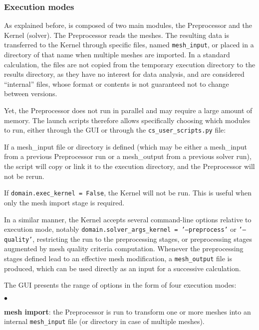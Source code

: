 {{{{{%
\subsubsection{Execution modes}
\label{sec:prg_executionmodes}%
As explained before, \CS is composed of two main modules, the Preprocessor and the
Kernel (solver). The Preprocessor reads the meshes.
The resulting data is transferred to the Kernel through specific
files, named \texttt{mesh\_input}, or placed in a directory of that name when multiple meshes are imported. In a standard calculation, the files
are not copied from the temporary execution directory to the results directory,
as they have no interest for data analysis, and are considered ``internal''
files, whose format or contents is not guaranteed not to change between \CS versions.

Yet, the Preprocessor does not run in parallel and may require a
large amount of memory. The launch scripts therefore allows specifically
choosing which modules to run, either through the GUI or through the
\texttt{cs\_user\_scripts.py} file:

\hspace*{0.5cm} If a {mesh\_input} file or directory is defined (which may be
either a {mesh\_input} from a previous Preprocessor run or a {mesh\_output}
from a previous solver run), the script will copy or link it to
the execution directory, and the Preprocessor will not be rerun.

\hspace*{0.5cm} If \texttt{domain.exec\_kernel = False}, the Kernel will not
be run. This is useful when only the mesh import stage is required.

In a similar manner, the Kernel accepts several command-line options relative to execution mode, notably \texttt{domain.solver\_args\_kernel = '--preprocess'} or \texttt{'--quality'}, restricting the run to the preprocessing stages, or preprocessing stages augmented by mesh quality criteria computation. Whenever the preprocessing stages defined lead to an effective mesh modification, a \texttt{mesh\_output} file is produced, which can be used directly as an input for a successive calculation.

The GUI presents the range of options in the form of four execution modes:

\begin{list}{$\bullet$}{}

\item {\bf mesh import}: the Preprocessor is run to transform one or more meshes into an internal \texttt{mesh\_input} file (or directory in case of multiple meshes).


\end{list}}}}}}
